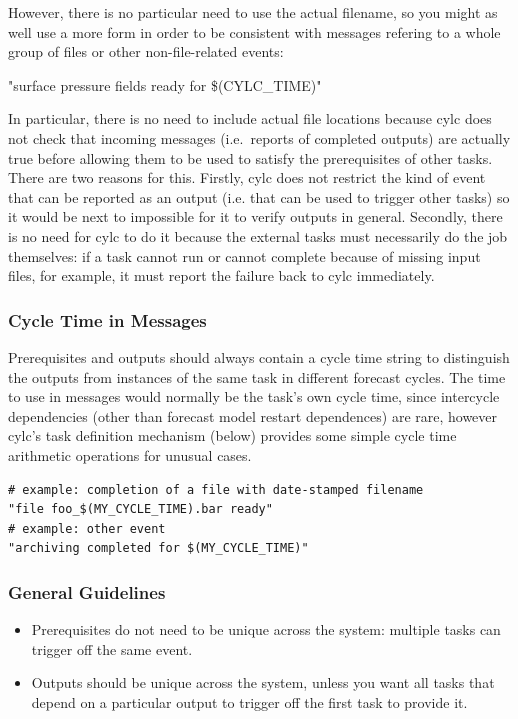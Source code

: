 \documentclass[11pt,a4paper]{article}
\begin{document}
However, there is no particular need to use the actual filename, 
so you might as well use a more form in order to be consistent with
messages refering to a whole group of files or other non-file-related
events:
\begin{lstinline}
    "surface pressure fields ready for \$(CYLC_TIME)"
\end{lstinline}

In particular, there is no need to include actual file locations because
cylc does not check that incoming messages (i.e.\ reports of completed
outputs) are actually true before allowing them to be used to satisfy
the prerequisites of other tasks. There are two reasons for this.
Firstly, cylc does not restrict the kind of event that can be reported
as an output (i.e. that can be used to trigger other tasks) so it would
be next to impossible for it to verify outputs in general. Secondly, 
there is no need for cylc to do it because the external tasks must
necessarily do the job themselves: if a task cannot run or cannot
complete because of missing input files, for example, it must report the
failure back to cylc immediately.


\subsubsection{Cycle Time in Messages}

Prerequisites and outputs should always contain a cycle time string to
distinguish the outputs from instances of the same task in different
forecast cycles. The time to use in messages would normally be the
task's own cycle time, since intercycle dependencies (other than
forecast model restart dependences) are rare, however cylc's task
definition mechanism (below) provides some simple cycle time arithmetic
operations for unusual cases. 

\lstset{language=Python}
\begin{lstlisting}
# example: completion of a file with date-stamped filename
"file foo_$(MY_CYCLE_TIME).bar ready"
# example: other event
"archiving completed for $(MY_CYCLE_TIME)"
\end{lstlisting}


\subsubsection{General Guidelines}

\begin{itemize}

    \item Prerequisites do not need to be unique across the system:
        multiple tasks can trigger off the same event.

    \item Outputs should be unique across the system, unless you want
        all tasks that depend on a particular output to trigger off the
        first task to provide it.

\end{itemize}
\end{document}
